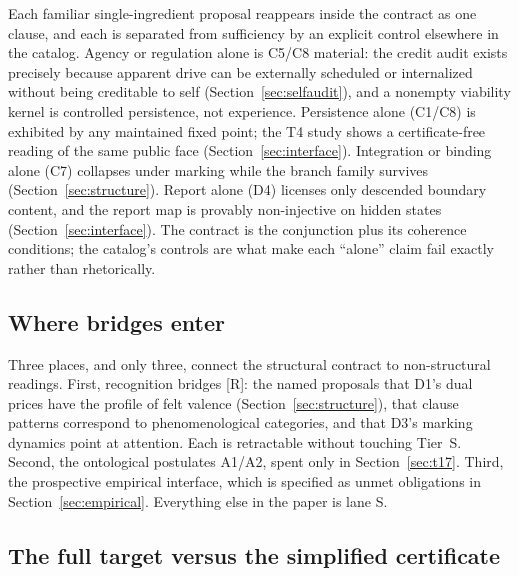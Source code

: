 \documentclass[11pt]{article}
\newcommand{\gradeR}{\textsf{[R]}}
\theoremstyle{definition}
\begin{document}
Each familiar single-ingredient proposal reappears inside the contract as one
clause, and each is separated from sufficiency by an explicit control
elsewhere in the catalog. Agency or regulation alone is C5/C8 material:
the credit audit exists precisely because apparent drive can be externally
scheduled or internalized without being creditable to self
(Section~\ref{sec:selfaudit}), and a nonempty viability kernel is controlled
persistence, not experience. Persistence alone (C1/C8) is exhibited by any
maintained fixed point; the T4 study shows a certificate-free reading of the
same public face (Section~\ref{sec:interface}). Integration or binding alone
(C7) collapses under marking while the branch family survives
(Section~\ref{sec:structure}). Report alone (D4) licenses only descended
boundary content, and the report map is provably non-injective on hidden
states (Section~\ref{sec:interface}). The contract is the conjunction plus its
coherence conditions; the catalog's controls are what make each ``alone''
claim fail exactly rather than rhetorically.

\subsection{Where bridges enter}

Three places, and only three, connect the structural contract to
non-structural readings. First, recognition bridges \gradeR{}: the named
proposals that D1's dual prices have the profile of felt valence
(Section~\ref{sec:structure}), that clause patterns correspond to
phenomenological categories, and that D3's marking dynamics point at
attention. Each is retractable without touching Tier~S. Second, the
ontological postulates A1/A2, spent only in Section~\ref{sec:t17}. Third, the
prospective empirical interface, which is specified as unmet obligations in
Section~\ref{sec:empirical}. Everything else in the paper is lane S.

\subsection{The full target versus the simplified certificate}
\label{sec:fullvssimp}
\end{document}
